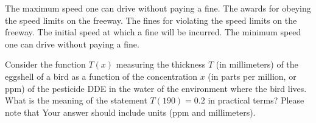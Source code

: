 \documentclass[11pt,answers]{exam}
\begin{document}
\begin{questions}
\begin{parts}
		\begin{choices}
			\choice The maximum speed one can drive without paying a fine.
			\choice The awards for obeying the speed limits on the freeway.
			\choice The fines for violating the speed limits on the freeway.    
			\choice The initial speed at which a fine will be incurred.
			\choice The minimum speed one can drive without paying a fine.
			\end{choices}
			\end{parts}
	\bonusquestion[2] Consider the function $T(x)$ measuring the thickness $T$ (in millimeters) of the eggshell of a bird as a function of the
	concentration $x$ (in parts per million, or ppm) of the pesticide DDE in the water of the environment where the bird lives.  What is the meaning of the
	statement $T(190) = 0.2$ in practical terms? Please note that Your answer should include units (ppm and millimeters).
	
	\fillwithdottedlines{1.5cm}
	




\end{questions}
\end{document}
